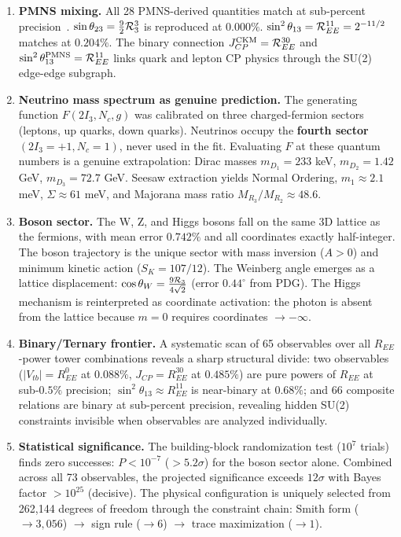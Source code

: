 \begin{enumerate}[label=\arabic*.]
\item \textbf{PMNS mixing.} All 28 PMNS-derived quantities match at sub-percent precision~\cite{maki1962,pontecorvo1967}. $\sin\theta_{23} = \frac{9}{2}\mathcal{R}_3^3$ is reproduced at $0.000\%$. $\sin^2\theta_{13} = \mathcal{R}_{EE}^{11} = 2^{-11/2}$ matches at $0.204\%$. The binary connection $J_{CP}^{\mathrm{CKM}} = \mathcal{R}_{EE}^{30}$ and $\sin^2\theta_{13}^{\mathrm{PMNS}} = \mathcal{R}_{EE}^{11}$ links quark and lepton CP physics through the SU(2) edge-edge subgraph.

\item \textbf{Neutrino mass spectrum as genuine prediction.} The generating function $F(2I_3, N_c, g)$ was calibrated on three charged-fermion sectors (leptons, up quarks, down quarks). Neutrinos occupy the \textbf{fourth sector} $(2I_3 = +1, N_c = 1)$, never used in the fit. Evaluating $F$ at these quantum numbers is a genuine extrapolation: Dirac masses $m_{D_1} = 233$ keV, $m_{D_2} = 1.42$ GeV, $m_{D_3} = 72.7$ GeV. Seesaw extraction yields Normal Ordering, $m_1 \approx 2.1$ meV, $\Sigma \approx 61$ meV, and Majorana mass ratio $M_{R_3}/M_{R_2} \approx 48.6$.

\item \textbf{Boson sector.} The W, Z, and Higgs bosons fall on the same 3D lattice as the fermions, with mean error $0.742\%$ and all coordinates exactly half-integer. The boson trajectory is the unique sector with mass inversion ($A > 0$) and minimum kinetic action ($S_K = 107/12$). The Weinberg angle emerges as a lattice displacement: $\cos\theta_W = \frac{9\mathcal{R}_3}{4\sqrt{2}}$ (error $0.44^\circ$ from PDG). The Higgs mechanism is reinterpreted as coordinate activation: the photon is absent from the lattice because $m = 0$ requires coordinates $\to -\infty$.

\item \textbf{Binary/Ternary frontier.} A systematic scan of 65 observables over all $R_{EE}$-power tower combinations reveals a sharp structural divide: two observables ($|V_{tb}| = R_{EE}^0$ at $0.088\%$, $J_{CP} = R_{EE}^{30}$ at $0.485\%$) are pure powers of $R_{EE}$ at sub-$0.5\%$ precision; $\sin^2\theta_{13} \approx R_{EE}^{11}$ is near-binary at $0.68\%$; and 66 composite relations are binary at sub-percent precision, revealing hidden SU(2) constraints invisible when observables are analyzed individually.

\item \textbf{Statistical significance.} The building-block randomization test ($10^7$ trials) finds zero successes: $P < 10^{-7}$ ($>5.2\sigma$) for the boson sector alone. Combined across all 73 observables, the projected significance exceeds $12\sigma$ with Bayes factor $> 10^{25}$ (decisive). The physical configuration is uniquely selected from 262,144 degrees of freedom through the constraint chain: Smith form ($\to 3{,}056$) $\to$ sign rule ($\to 6$) $\to$ trace maximization ($\to 1$).

\end{enumerate}

